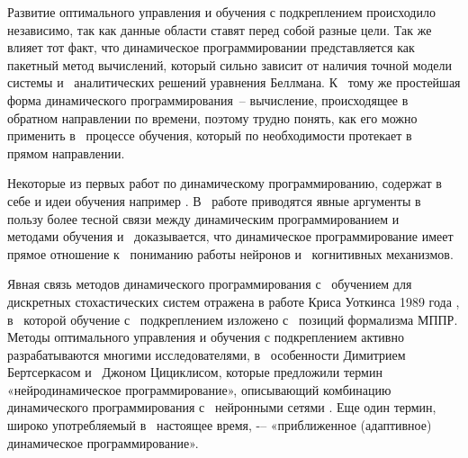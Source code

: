 Развитие оптимального управления и обучения с подкреплением происходило независимо, так как данные области ставят перед собой разные цели. 
Так же влияет тот факт, что динамическое программировании  представляется как  пакетный  метод  вычислений,  который  сильно  зависит от  наличия  точной  модели  системы  и  аналитических  решений  уравнения  Беллмана. К  тому же  простейшая  форма  динамического  программирования – вычисление,  происходящее  в  обратном  направлении  по  времени,  поэтому  трудно  понять, как  его  можно  применить в  процессе  обучения, который  по  необходимости протекает  в  прямом  направлении. 

Некоторые  из  первых  работ  по  динамическому  программированию, содержат в себе и идеи обучения например  \cite{bellman1959functional}.  В  работе  \cite{werbos1987} приводятся  явные  аргументы  в  пользу  более  тесной  связи  между  динамическим программированием  и  методами  обучения  и  доказывается,  что  динамическое программирование  имеет  прямое  отношение  к  пониманию работы  нейронов и  когнитивных  механизмов.  


Явная связь методов  динамического программирования  с  обучением для дискретных стохастических систем отражена в работе  Криса  Уоткинса  1989  года \cite{watkins1989learning},  в  которой  обучение с  подкреплением изложено  с  позиций  формализма  МППР. Методы оптимального управления и обучения с подкреплением активно  разрабатываются  многими  исследователями, в  особенности  Димитрием Бертсеркасом  и  Джоном  Цициклисом, которые  предложили  термин  «нейродинамическое  программирование»,  описывающий  комбинацию динамического  программирования  с  нейронными  сетями \cite{bertsekas1996neuro}. Еще  один  термин,  широко  употребляемый  в  настоящее  время, -–  «приближенное (адаптивное) динамическое  программирование».  



